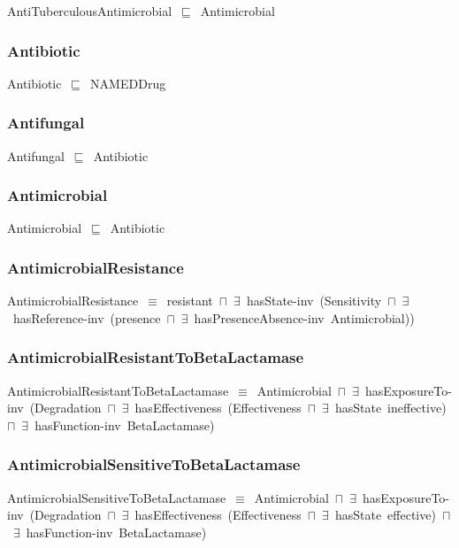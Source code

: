 \documentclass{article}
\begin{document}
AntiTuberculousAntimicrobial~\ensuremath{\sqsubseteq}~Antimicrobial~

\subsubsection*{Antibiotic}

Antibiotic~\ensuremath{\sqsubseteq}~NAMEDDrug~

\subsubsection*{Antifungal}

Antifungal~\ensuremath{\sqsubseteq}~Antibiotic~

\subsubsection*{Antimicrobial}

Antimicrobial~\ensuremath{\sqsubseteq}~Antibiotic~

\subsubsection*{AntimicrobialResistance}

AntimicrobialResistance~\ensuremath{\equiv}~resistant~\ensuremath{\sqcap}~\ensuremath{\exists}~hasState-inv~(Sensitivity~\ensuremath{\sqcap}~\ensuremath{\exists}~hasReference-inv~(presence~\ensuremath{\sqcap}~\ensuremath{\exists}~hasPresenceAbsence-inv~Antimicrobial))

\subsubsection*{AntimicrobialResistantToBetaLactamase}

AntimicrobialResistantToBetaLactamase~\ensuremath{\equiv}~Antimicrobial~\ensuremath{\sqcap}~\ensuremath{\exists}~hasExposureTo-inv~(Degradation~\ensuremath{\sqcap}~\ensuremath{\exists}~hasEffectiveness~(Effectiveness~\ensuremath{\sqcap}~\ensuremath{\exists}~hasState~ineffective)~\ensuremath{\sqcap}~\ensuremath{\exists}~hasFunction-inv~BetaLactamase)

\subsubsection*{AntimicrobialSensitiveToBetaLactamase}

AntimicrobialSensitiveToBetaLactamase~\ensuremath{\equiv}~Antimicrobial~\ensuremath{\sqcap}~\ensuremath{\exists}~hasExposureTo-inv~(Degradation~\ensuremath{\sqcap}~\ensuremath{\exists}~hasEffectiveness~(Effectiveness~\ensuremath{\sqcap}~\ensuremath{\exists}~hasState~effective)~\ensuremath{\sqcap}~\ensuremath{\exists}~hasFunction-inv~BetaLactamase)
\end{document}
